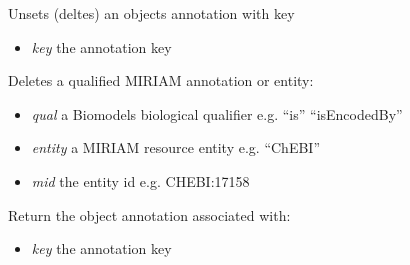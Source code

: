 \documentclass[a4paper,11pt,english]{sphinxmanual}
\begin{document}
\begin{fulllineitems}
\begin{fulllineitems}
\end{fulllineitems}


\begin{fulllineitems}
\label{modules_doc:cbmpy.CBModel.Fbase.deleteAnnotation}
Unsets (deltes) an objects annotation with key
\begin{itemize}
\item {} 
\emph{key} the annotation key

\end{itemize}

\end{fulllineitems}


\begin{fulllineitems}
\label{modules_doc:cbmpy.CBModel.Fbase.deleteMIRIAMannotation}
Deletes a qualified MIRIAM annotation or entity:
\begin{itemize}
\item {} 
\emph{qual} a Biomodels biological qualifier e.g. ``is'' ``isEncodedBy''

\item {} 
\emph{entity} a MIRIAM resource entity e.g. ``ChEBI''

\item {} 
\emph{mid} the entity id e.g. CHEBI:17158

\end{itemize}

\end{fulllineitems}


\begin{fulllineitems}
\label{modules_doc:cbmpy.CBModel.Fbase.getAnnotation}
Return the object annotation associated with:
\begin{itemize}
\item {} 
\emph{key} the annotation key

\end{itemize}

\end{fulllineitems}



\end{fulllineitems}
\end{document}
